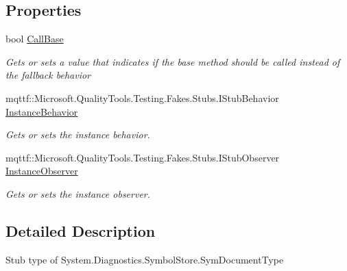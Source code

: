 \subsection*{Properties}
\begin{DoxyCompactItemize}
\item 
bool \hyperlink{class_system_1_1_diagnostics_1_1_symbol_store_1_1_fakes_1_1_stub_sym_document_type_a1ca2c633c2905ba8d3dc2564b3509424}{Call\-Base}
\begin{DoxyCompactList}\small\item\em Gets or sets a value that indicates if the base method should be called instead of the fallback behavior\end{DoxyCompactList}\item 
mqttf\-::\-Microsoft.\-Quality\-Tools.\-Testing.\-Fakes.\-Stubs.\-I\-Stub\-Behavior \hyperlink{class_system_1_1_diagnostics_1_1_symbol_store_1_1_fakes_1_1_stub_sym_document_type_a90a40ee39138ead3b23c841a648e2a9b}{Instance\-Behavior}
\begin{DoxyCompactList}\small\item\em Gets or sets the instance behavior.\end{DoxyCompactList}\item 
mqttf\-::\-Microsoft.\-Quality\-Tools.\-Testing.\-Fakes.\-Stubs.\-I\-Stub\-Observer \hyperlink{class_system_1_1_diagnostics_1_1_symbol_store_1_1_fakes_1_1_stub_sym_document_type_ad0a188d1a03dd17388a23fc989801482}{Instance\-Observer}
\begin{DoxyCompactList}\small\item\em Gets or sets the instance observer.\end{DoxyCompactList}\end{DoxyCompactItemize}


\subsection{Detailed Description}
Stub type of System.\-Diagnostics.\-Symbol\-Store.\-Sym\-Document\-Type



